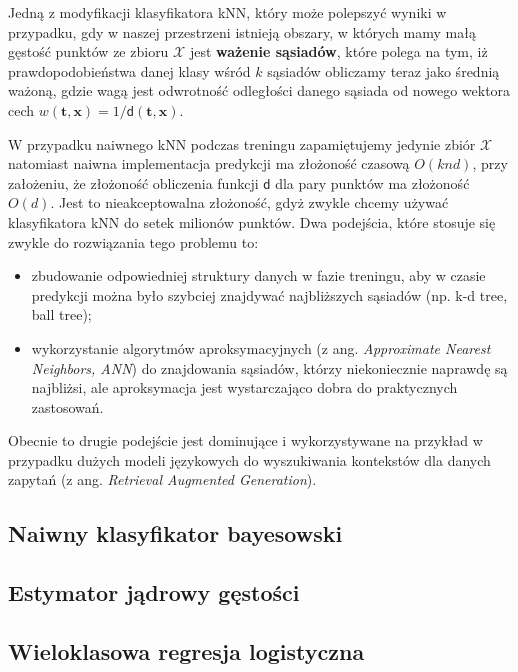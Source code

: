 \documentclass{myclass}
\numberwithin{equation}{section}
\begin{document}
Jedną z modyfikacji klasyfikatora kNN, który może polepszyć wyniki w przypadku, gdy w naszej
przestrzeni istnieją obszary, w których mamy małą gęstość punktów ze zbioru \(\mathcal{X}\) jest
\textbf{ważenie sąsiadów}, które polega na tym, iż prawdopodobieństwa danej klasy wśród \(k\)
sąsiadów obliczamy teraz jako średnią ważoną, gdzie wagą jest odwrotność odległości danego sąsiada
od nowego wektora cech \(w(\mathbf{t}, \mathbf{x}) = 1 / \mathsf{d}(\mathbf{t}, \mathbf{x})\).

W przypadku naiwnego kNN podczas treningu zapamiętujemy jedynie zbiór \(\mathcal{X}\) natomiast
naiwna implementacja predykcji ma złożoność czasową \(O(knd)\), przy założeniu, że złożoność
obliczenia funkcji \(\mathsf{d}\) dla pary punktów ma złożoność \(O(d)\). Jest to nieakceptowalna
złożoność, gdyż zwykle chcemy używać klasyfikatora kNN do setek milionów punktów. Dwa podejścia,
które stosuje się zwykle do rozwiązania tego problemu to: 
\begin{itemize}

    \item zbudowanie odpowiedniej struktury danych w fazie treningu, aby w czasie predykcji można
    było szybciej znajdywać najbliższych sąsiadów (np. k-d tree, ball tree);

    \item wykorzystanie algorytmów aproksymacyjnych (z ang. \textit{Approximate Nearest Neighbors,
    ANN}) do znajdowania sąsiadów, którzy niekoniecznie naprawdę są najbliżsi, ale aproksymacja jest
    wystarczająco dobra do praktycznych zastosowań.

\end{itemize}

Obecnie to drugie podejście jest dominujące i wykorzystywane na przykład w przypadku dużych modeli
językowych do wyszukiwania kontekstów dla danych zapytań (z ang. \textit{Retrieval Augmented
Generation}).

\subsection{Naiwny klasyfikator bayesowski}


\subsection{Estymator jądrowy gęstości}


\subsection{Wieloklasowa regresja logistyczna}
\end{document}
